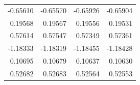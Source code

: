 \documentclass{article}\usepackage[]{graphicx}\usepackage[]{color}
\begin{document}
\begin{table}[H]
\begin{tabular}{rrrr}
\hspace{1em}-0.65610 & -0.65570 & -0.65926 & -0.65904\\
\hspace{1em}0.19568 & 0.19567 & 0.19556 & 0.19531\\
\hspace{1em}0.57614 & 0.57547 & 0.57349 & 0.57361\\
\hspace{1em}-1.18333 & -1.18319 & -1.18455 & -1.18428\\
\hspace{1em}0.10695 & 0.10679 & 0.10637 & 0.10630\\
\hspace{1em}0.52682 & 0.52683 & 0.52564 & 0.52553\\
\bottomrule
\end{tabular}
\end{table}
\end{document}
